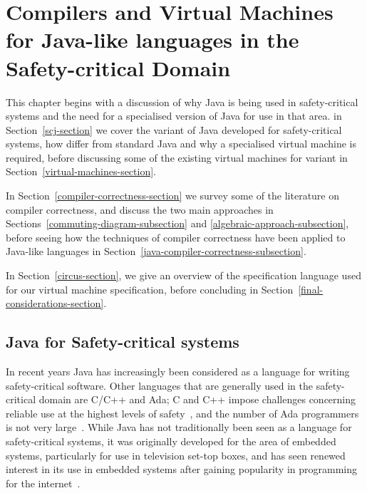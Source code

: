 \chapter{Compilers and Virtual Machines for Java-like languages in the
  Safety-critical Domain}
\label{literature-review-chapter}

This chapter begins with a discussion of why Java is being used in
safety-critical systems and the need for a specialised version of Java
for use in that area.
 in
Section~\ref{scj-section}\added{,} we cover the variant of Java
developed for safety-critical systems, how differ from standard Java and why a
specialised virtual machine is required, before discussing some of the
existing virtual machines for variant in Section~\ref{virtual-machines-section}.

In Section~\ref{compiler-correctness-section} we survey some of the
literature on compiler correctness, and discuss the two main
approaches in Sections~\ref{commuting-diagram-subsection} and
\ref{algebraic-approach-subsection}, before seeing how the techniques
of compiler correctness have been applied to Java-like languages in
Section~\ref{java-compiler-correctness-subsection}.

In Section~\ref{circus-section}, we give an overview of the \Circus{}
specification language used for our virtual machine specification,
before concluding in Section~\ref{final-considerations-section}.

\section{Java for Safety-critical systems}
\label{java-safety-critical-section}


In recent years Java has increasingly been considered as a language
for writing safety-critical software.
Other languages that are generally used in the safety-critical domain
are C/C++ and Ada; C and C++ impose challenges concerning reliable use
at the highest levels of safety~\cite{kornecki2009}, and the number of
Ada programmers is not very large~\cite{bissyande2013}.
While Java has not traditionally been seen as a language for
safety-critical systems, it was originally developed for the area of
embedded systems, particularly for use in television set-top boxes,
and has seen renewed interest in its use in embedded systems after
gaining popularity in programming for the
internet~\cite{mulchandani1998}.

